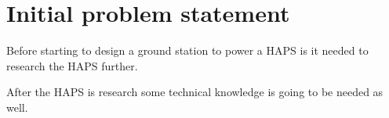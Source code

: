 \section{Initial problem statement}



Before starting to design a ground station to power a HAPS is it needed to research the HAPS further. 

After the HAPS is research some technical knowledge is going to be needed as well. 




